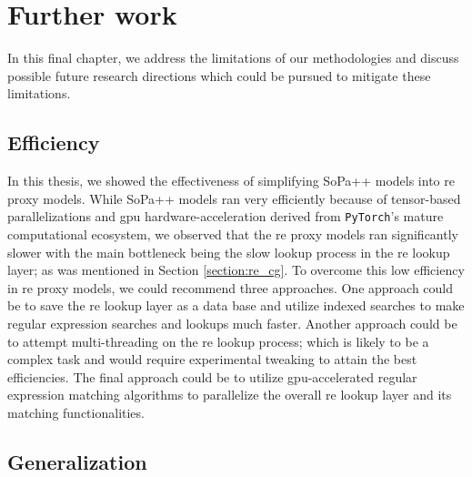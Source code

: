 \chapter{Further work}

\label{chapter:further_work}

In this final chapter, we address the limitations of our methodologies and
discuss possible future research directions which could be pursued to mitigate
these limitations.

\section{Efficiency}

In this thesis, we showed the effectiveness of simplifying SoPa++ models into \ac{re}
proxy models. While SoPa++ models ran very efficiently because of tensor-based
parallelizations and \ac{gpu} hardware-acceleration derived from \texttt{PyTorch}'s
mature computational ecosystem, we observed that the \ac{re} proxy models ran
significantly slower with the main bottleneck being the slow lookup process in
the \ac{re} lookup layer; as was mentioned in Section \ref{section:re_cg}. To
overcome this low efficiency in \ac{re} proxy models, we could recommend three
approaches. One approach could be to save the \ac{re} lookup layer as a data base and
utilize indexed searches to make regular expression searches and lookups much
faster. Another approach could be to attempt multi-threading on the \ac{re}
lookup process; which is likely to be a complex task and would require
experimental tweaking to attain the best efficiencies. The final approach could
be to utilize \ac{gpu}-accelerated regular expression matching algorithms
\citep{wang2011gregex,zu2012gpu,yu2013gpu} to parallelize the overall \ac{re} lookup
layer and its matching functionalities.

\section{Generalization}

